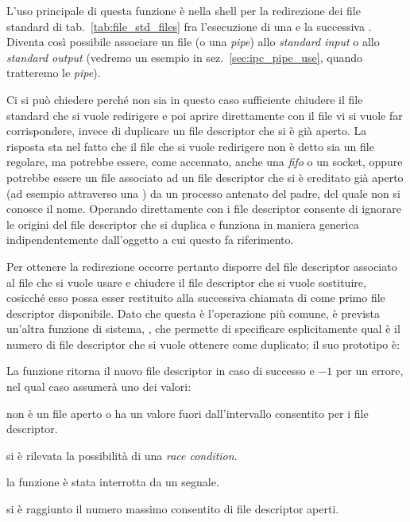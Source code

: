 L'uso principale di questa funzione è nella shell per la redirezione dei file
standard di tab.~\ref{tab:file_std_files} fra l'esecuzione di una 
e la successiva . Diventa così possibile associare un file (o una
\textit{pipe}) allo \textit{standard input} o allo \textit{standard output}
(vedremo un esempio in sez.~\ref{sec:ipc_pipe_use}, quando tratteremo le
\textit{pipe}).

Ci si può chiedere perché non sia in questo caso sufficiente chiudere il file
standard che si vuole redirigere e poi aprire direttamente con  il
file vi si vuole far corrispondere, invece di duplicare un file descriptor che
si è già aperto. La risposta sta nel fatto che il file che si vuole redirigere
non è detto sia un file regolare, ma potrebbe essere, come accennato, anche
una \textit{fifo} o un socket, oppure potrebbe essere un file associato ad un
file descriptor che si è ereditato già aperto (ad esempio attraverso una
) da un processo antenato del padre, del quale non si conosce il
nome. Operando direttamente con i file descriptor  consente di
ignorare le origini del file descriptor che si duplica e funziona in maniera
generica indipendentemente dall'oggetto a cui questo fa riferimento.

Per ottenere la redirezione occorre pertanto disporre del file descriptor
associato al file che si vuole usare e chiudere il file descriptor che si
vuole sostituire, cosicché esso possa esser restituito alla successiva
chiamata di  come primo file descriptor disponibile.  Dato che
questa è l'operazione più comune, è prevista un'altra funzione di sistema,
, che permette di specificare esplicitamente qual è il numero di
file descriptor che si vuole ottenere come duplicato; il suo prototipo è:

\begin{funcproto}{
}

{La funzione ritorna il nuovo file descriptor in caso di successo e $-1$ per
  un errore, nel qual caso  assumerà uno dei valori:
  \begin{errlist}
  \item[\errcode{EBADF}]  non è un file aperto o  ha
    un valore fuori dall'intervallo consentito per i file descriptor.
  \item[\errcode{EBUSY}] si è rilevata la possibilità di una \textit{race
      condition}.
  \item[\errcode{EINTR}] la funzione è stata interrotta da un segnale.
  \item[\errcode{EMFILE}] si è raggiunto il numero massimo consentito di file
    descriptor aperti.
  \end{errlist}
}  
\end{funcproto}

